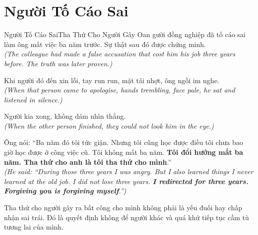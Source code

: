 \section{Người Tố Cáo Sai}
\begin{truyen}{Người Tố Cáo Sai}{Tha Thứ Cho Người Gây Oan}
gười đồng nghiệp đã tố cáo sai làm ông mất việc ba năm trước. Sự thật sau đó được chứng minh.\\
\textit{(The colleague had made a false accusation that cost him his job three years before. The truth was later proven.)}

Khi người đó đến xin lỗi, tay run run, mặt tái nhợt, ông ngồi im nghe.\\
\textit{(When that person came to apologise, hands trembling, face pale, he sat and listened in silence.)}

Người kia xong, không dám nhìn thẳng.\\
\textit{(When the other person finished, they could not look him in the eye.)}

Ông nói: ``Ba năm đó tôi tức giận. Nhưng tôi cũng học được điều tôi chưa bao giờ học được ở công việc cũ. Tôi không mất ba năm. \textbf{Tôi đổi hướng mất ba năm. Tha thứ cho anh là tôi tha thứ cho mình}.''\\
\textit{(He said: ``During those three years I was angry. But I also learned things I never learned at the old job. I did not lose three years. \textbf{I redirected for three years. Forgiving you is forgiving myself}.'')}
\end{truyen}
\begin{baihoc}
  Tha thứ cho người gây ra bất công cho mình không phải là yếu đuối hay chấp nhận sai trái. Đó là quyết định không để người khác và quá khứ tiếp tục cầm tù tương lai của mình.
\end{baihoc}

